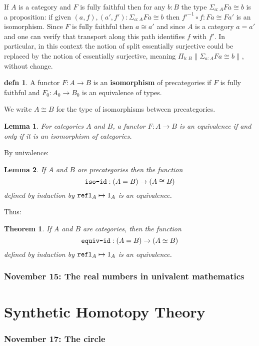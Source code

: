 \documentclass{amsart}
\theoremstyle{theorem}
\newtheorem*{thm}{Theorem}
\newtheorem*{lem}{Lemma}
\theoremstyle{definition}
\newtheorem*{defn}{defn}
\theoremstyle{remark}
\newcommand{\0}{\mathbbe{0}}
\newcommand{\1}{\mathbbe{1}}
\newcommand{\2}{\mathbbe{2}}
\newcommand{\3}{\mathbbe{3}}
\newcommand{\4}{\mathbbe{4}}
\newcommand{\term}[1]{{\textup{\texttt{#1}}}}
\newcommand{\refl}{\term{refl}}
\begin{document}
If $A$ is a category and $F$ is fully faithful then for any $b : B$ the type $\Sigma_{a:A} Fa \cong b$ is a proposition: if given $(a,f),(a',f') : \Sigma_{a:A} Fa \cong b$ then $f'^{-1} \circ f \colon Fa \cong Fa'$ is an isomorphism. Since $F$ is fully faithful then $a \cong a'$ and since $A$ is a category $a=a'$ and one can verify that transport along this path identifies $f$ with $f'$. In particular, in this context the notion of split essentially surjective could be replaced by the notion of essentially surjective, meaning $\Pi_{b:B} \|\Sigma_{a:A} Fa \cong b\|$, without change.

\begin{defn} A functor $F \colon A \to B$ is an \textbf{isomorphism} of precategories if $F$ is fully faithful and $F_0 : A_0 \to B_0$ is an equivalence of types.
\end{defn}

We write $A \cong B$ for the type of isomorphisms between precategories.

\begin{lem} For categories $A$ and $B$, a functor $F \colon A \to B$ is an equivalence if and only if it is an isomorphism of categories.
\end{lem}

By univalence: 
\begin{lem} If $A$ and $B$ are precategories then the function 
\[ \term{iso-id} : (A=B) \to (A \cong B)\]
defined by induction by $\refl_A \mapsto 1_A$ is an equivalence.
\end{lem}

Thus:

\begin{thm} If $A$ and $B$ are categories, then the function 
\[ \term{equiv-id} : (A=B) \to (A \simeq B)\]
defined by induction by $\refl_A\mapsto 1_A$ is an equivalence.
\end{thm}


\section*{November 15: The real numbers in univalent mathematics}


\part{Synthetic Homotopy Theory}

\section*{November 17: The circle}
\end{document}
